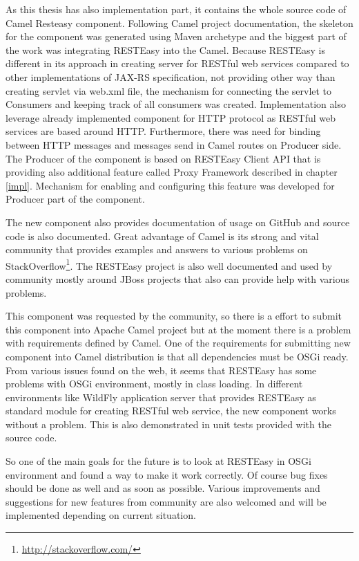 \documentclass[12pt,final,oneside]{fithesis2}
\begin{document}
As this thesis has also implementation part, it contains the whole source code of Camel Resteasy component. Following Camel project documentation, the skeleton for the component was generated using Maven archetype and the biggest part of the work was integrating RESTEasy into the Camel. Because RESTEasy is different in its approach in creating server for RESTful web services compared to other implementations of JAX-RS specification, not providing other way than creating servlet via web.xml file, the mechanism for connecting the servlet to Consumers and keeping track of all consumers was created. Implementation also leverage already implemented component for HTTP protocol as RESTful web services are based around HTTP. Furthermore, there was need for binding between HTTP messages and messages send in Camel routes on Producer side. The Producer of the component is based on RESTEasy Client API that is providing also additional feature called Proxy Framework described in chapter \ref{impl}. Mechanism for enabling and configuring this feature was developed for Producer part of the component.

The new component also provides documentation of usage on GitHub and source code is also documented. Great advantage of Camel is its strong and vital community that provides examples and answers to various problems on StackOverflow\footnote{\url{http://stackoverflow.com/}}. The RESTEasy project is also well documented and used by community mostly around JBoss projects that also can provide help with various problems.

This component was requested by the community, so there is a effort to submit this component into Apache Camel project but at the moment there is a problem with requirements defined by Camel. One of the requirements for submitting new component into Camel distribution is that all dependencies must be OSGi ready. From various issues found on the web, it seems that RESTEasy has some problems with OSGi environment, mostly in class loading. In different environments like WildFly application server that provides RESTEasy as standard module for creating RESTful web service, the new component works without a problem. This is also demonstrated in unit tests provided with the source code. 

So one of the main goals for the future is to look at RESTEasy in OSGi environment and found a way to make it work correctly. Of course bug fixes should be done as well and as soon as possible. Various improvements and suggestions for new features from community are also welcomed and will be implemented depending on current situation.
\end{document}
